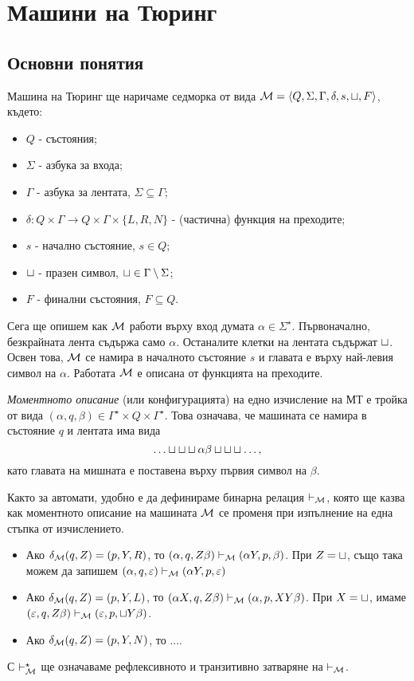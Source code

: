 \chapter{Машини на Тюринг}

\newcommand{\tape}[1]{\dots\blank\blank\blank{#1}\blank\blank\blank\dots}

\section{Основни понятия}
Машина на Тюринг ще наричаме седморка от вида $\mathcal{M} = \langle{Q,\Sigma,\Gamma,\delta,s,\sqcup,F}\rangle$, където:
\begin{itemize}
\item 
  $Q$ - състояния;
\item
  $\Sigma$ - азбука за входа;
\item
  $\Gamma$ - азбука за лентата, $\Sigma \subseteq \Gamma$;
\item
  $\delta:Q\times\Gamma \to Q\times \Gamma \times \{L,R,N\}$ - (частична) функция на преходите;
\item
  $s$ - начално състояние, $s \in Q$;
\item
  $\sqcup$ - празен символ,  $\sqcup \in \Gamma \setminus \Sigma$;
\item
  $F$ - финални състояния, $F \subseteq Q$.
\end{itemize}

Сега ще опишем как $\mathcal{M}$ работи върху вход думата $\alpha \in \Sigma^\star$.
Първоначално, безкрайната лента съдържа само $\alpha$. Останалите клетки на лентата съдържат $\sqcup$.
Освен това, $\mathcal{M}$ се намира в началното състояние $s$ и главата е върху най-левия символ на $\alpha$.
Работата $\mathcal{M}$ е описана от функцията на преходите.
  
{\em Моментното описание} (или конфигурацията) на едно изчисление на МТ е тройка от вида $(\alpha, q, \beta) \in \Gamma^\star\times Q \times \Gamma^\star$. Това означава, че
машината се намира в състояние $q$ и лентата има вида
\[\tape{\alpha\beta},\]
като главата на мишната е поставена върху първия символ на $\beta$.

Както за автомати, удобно е да дефинираме бинарна релация $\vdash_{\mathcal{M}}$,
която ще казва как моментното описание на машината $\mathcal{M}$ се променя при 
изпълнение на една стъпка от изчислението.
\begin{itemize}
\item
  Ако $\delta_{\mathcal{M}}(q,Z) = (p,Y,R)$, то $(\alpha, q, Z\beta) \vdash_{\mathcal{M}} (\alpha Y, p, \beta)$.
  При $Z = \sqcup$, също така можем да запишем 
  $(\alpha, q, \varepsilon) \vdash_{\mathcal{M}} (\alpha Y, p, \varepsilon)$
\item 
  Ако $\delta_{\mathcal{M}}(q,Z) = (p,Y,L)$, то $(\alpha X, q, Z\beta) \vdash_{\mathcal{M}} (\alpha , p, XY\beta)$.
  При $X = \sqcup$, имаме $(\varepsilon, q, Z\beta) \vdash_{\mathcal{M}} (\varepsilon, p, \sqcup Y\beta)$.
\item
  Ако $\delta_{\mathcal{M}}(q,Z) = (p,Y,N)$, то ....
\end{itemize}
С $\vdash^\star_{\mathcal{M}}$ ще означаваме рефлексивното и транзитивно затваряне на $\vdash_{\mathcal{M}}$.

